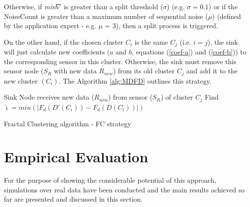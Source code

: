 \documentclass{acm_proc_article-sp}
\begin{document}
Otherwise, if {\it min}$\nabla$ is greater than a split threshold ($\sigma$)
(e.g. $\sigma = 0.1$) or if the NoiseCount is greater than a maximum number of
sequential noise ($\mu$) (defined by the application expert - e.g. $\mu$ = 3),
then a split process is triggered.
\vspace*{-.3cm}

On the other hand, if the chosen cluster $C_i$ is the same $C_j$ (i.e.
$i=j$), the sink will just calculate new coefficients ($a$ and $b$, equations
(\ref{coef-a}) and (\ref{coef-b})) to the corresponding sensor in this cluster.
Otherwise, the sink must remove this sensor node ($S_{R}$ with new data
$R_{new}$) from its old cluster $C_j$ and add it to the new cluster $(C_i)$.
The Algorithm \ref{alg:MDFD} outlines this strategy.

\begin{algorithm}
 \SetAlgoLined
 \LinesNumbered
 \small
 Sink Node receives new data ($R_{new}$) from sensor ($S_{R}$) of cluster $C_j$\;
  Find $\hat{\imath} = min(|F_d(D'(C_i)) - F_d(D(C_i))|)$\;
 \caption{Fractal Clustering algorithm - FC strategy}
 \label{alg:MDFD}
\end{algorithm}


\section{Empirical Evaluation}
\label{eval}

For the purpose of showing the considerable potential of this approach,
simulations over real data have been conducted and the main results achieved so
far are presented and discussed in this section.
\end{document}
